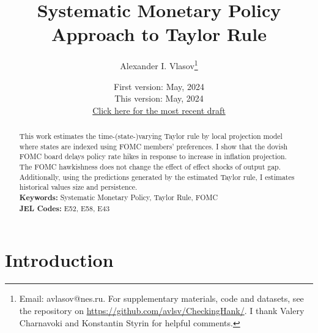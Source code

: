 \documentclass[11pt]{article}
\title{Systematic Monetary Policy Approach to Taylor Rule}
\author{Alexander I. Vlasov\thanks{Email: avlasov@nes.ru. For supplementary materials, code and datasets, see the repository on \href{https://github.com/avlsv/CheckingHank}{https://github.com/avlsv/CheckingHank/}. I thank Valery Charnavoki and Konstantin Styrin for helpful comments.}}
\date{\normalsize First version: May, 2024\\\vspace{1ex} This version: May, 2024\\ \vspace{1ex}
\href{https://github.com/alvlsv/CheckingHank/blob/main/Checking_HANK/Paper/CheckingHANK.pdf}{Click here for the most recent draft}}
\begin{document}
\maketitle



\begin{abstract}
    \noindent This work estimates the time-(state-)varying Taylor rule by local projection model where states are indexed using FOMC members' preferences. 
    I show that the dovish FOMC board delays policy rate hikes in response to increase in inflation projection. The FOMC hawkishness does not change the effect of effect shocks of output gap. 
    Additionally, using the predictions generated by the estimated Taylor rule, I estimates historical values size and persistence. 
    \\
    \noindent\textbf{Keywords:} Systematic Monetary Policy, Taylor Rule, FOMC
    \\
    \noindent\textbf{JEL Codes:} E52, E58, E43\\
    \bigskip
\end{abstract}

\section{Introduction}


\end{document}
